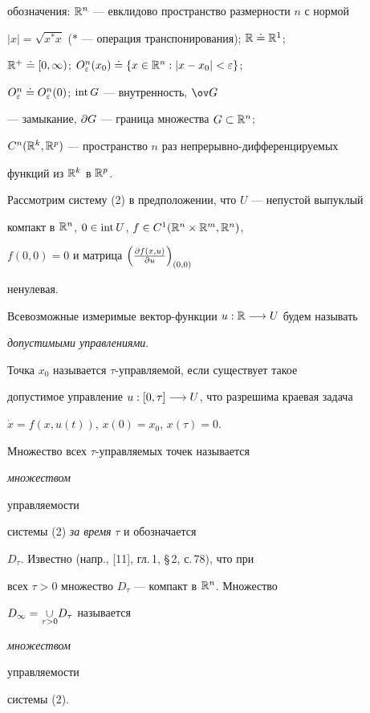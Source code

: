 обозначения: $\Bbb R^n$ --- евклидово пространство размерности $n$ с нормой


$|x|=\sqrt{x^*x}$ ($*$ --- операция транспонирования); $\Bbb R\doteq\Bbb R^1$;


$\Bbb R^+\doteq [0,\infty)$; $O^n_{\varepsilon}(x_0)\doteq\{x\in\Bbb R^n : |x-x_0|<\varepsilon\}$;


$O^n_\varepsilon\doteq O^n_{\varepsilon}(0)$; $\operatorname{int} G$ --- внутренность, $\ov G$


--- замыкание, $\partial G$ --- граница множества $G\subset\Bbb R^n$;


$C^n(\Bbb R^k,\Bbb R^p)$ --- пространство $n$ раз непрерывно-дифференцируемых


функций из $\Bbb R^k$ в $\Bbb R^p$.





Рассмотрим систему (2) в предположении, что $U$ --- непустой выпуклый


компакт в $\Bbb R^n$, $0\in\operatorname{int} U$, $f\in C^1(\Bbb R^n\times\Bbb R^m,\Bbb R^n)$,


$f(0,0)=0$ и матрица $\left(\frac{\partial f(x,u)}{\partial u}\right)_{(0,0)}$


ненулевая.





Всевозможные измеримые вектор-функции $u : \Bbb R\longrightarrow U$ будем называть


{\it допустимыми управлениями}.





Точка $x_0$ называется $\tau$-управляемой, если существует такое


допустимое управление $u:[0,\tau]\longrightarrow U$, что разрешима краевая задача


$\Dot x = f(x,u(t))$, $x(0)=x_0$, $x(\tau)=0$.





Множество всех $\tau$-управляемых точек называется {\it множеством


управляемости} системы (2) {\it за время} $\tau$ и обозначается


$D_{\tau}$.  Известно (напр., [11], гл.\,1, \S\,2, с.\,78), что при


всех $\tau>0$ множество $D_{\tau}$ --- компакт в $\Bbb R^n$.  Множество


$D_{\infty}=\underset{\tau>0}{\cup}{}D_{\tau}$ называется {\it множеством


управляемости} системы (2).





